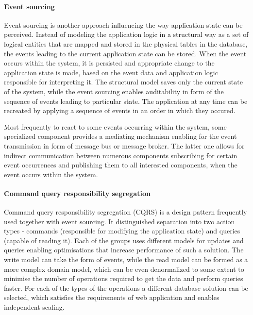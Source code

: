 \paragraph{Event sourcing}

Event sourcing is another approach influencing the way application state can be perceived. Instead of modeling the application logic in a structural way as a set of logical entities that are mapped and stored in the physical tables in the database, the events leading to the current application state can be stored. When the event occurs within the system, it is persisted and appropriate change to the application state is made, based on the event data and application logic responsible for interpreting it. The structural model saves only the current state of the system, while the event sourcing enables auditability in form of the sequence of events leading to particular state. The application at any time can be recreated by applying a sequence of events in an order in which they occured.

Most frequently to react to some events occurring within the system, some specialized component provides a mediating mechanism enabling for the event transmission in form of message bus or message broker. The latter one allows for indirect communication between numerous components subscribing for certain event occurrences and publishing them to all interested components, when the event occurs within the system.

\paragraph{Command query responsibility segregation}

Command query responsibility segregation (CQRS) is a design pattern frequently used together with event sourcing. It distinguished separation into two action types - commands (responsible for modifying the application state) and queries (capable of reading it). Each of the groups uses different models for updates and queries enabling optimisations that increase performance of such a solution. The write model can take the form of events, while the read model can be formed as a more complex domain model, which can be even denormalized to some extent to minimise the number of operations required to get the data and perform queries faster. For each of the types of the operations a different database solution can be selected, which satisfies the requirements of web application and enables independent scaling. 

